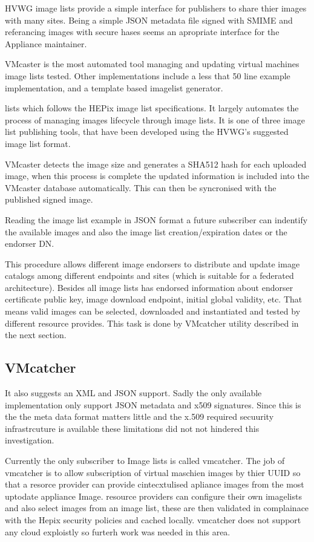 \documentclass{llncs_Ibergrid2013}
\begin{document}
 HVWG image lists provide a simple interface for publishers to share thier images with many sites. Being a simple JSON metadata file signed with SMIME and referancing images with secure hases seems an apropriate interface for the Appliance maintainer.
 
VMcaster is the most automated tool managing and updating virtual machines image lists tested. Other implementations include a less that 50 line example implementation, and a template based imagelist generator.

lists which follows the HEPix image list specifications. It largely automates the process of managing images lifecycle through image lists. It is one of three image list publishing tools, that have been developed using the HVWG's suggested image list format.

VMcaster detects the image size and generates a SHA512 hash for each uploaded image, when this process is complete the updated information is included into the VMcaster database automatically. This can then be syncronised with the published signed image.


Reading the image list example in JSON format a future subscriber can indentify the available images and also the image list creation/expiration dates or the endorser DN.

This procedure allows different image endorsers to distribute and update image catalogs among different endpoints and sites (which is suitable for a federated architecture).
Besides all image lists has endorsed information about endorser certificate public key, image download endpoint, initial global validity, etc. 
That means valid images can be selected, downloaded and instantiated and tested by different resource provides. 
This task is done by VMcatcher utility described in the next section.

\subsection{VMcatcher}

It also suggests an XML and JSON support. Sadly the only available implementation only support JSON metadata and x509 signatures. Since this is the the meta data format matters little and the x.509 required secuurity infrastrcuture is available these limitations did not not hindered this investigation.

Currently the only subscriber to Image lists is called vmcatcher. The job of vmcatcher is to allow subscription of virtual maschien images by thier UUID so that a resorce provider can provide cintecxtulised apliance images from the most uptodate appliance Image. resource providers can configure their own imagelists and also select images from an image list, these are then validated in complainace with the Hepix security policies and cached locally. vmcatcher does not support any cloud exploistly so furterh work was needed in this area.
\end{document}
